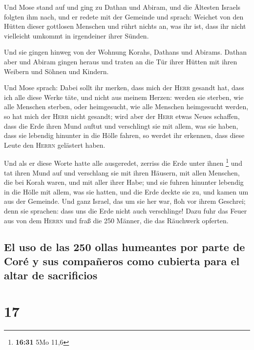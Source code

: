  Und Mose stand auf und ging zu Dathan und Abiram, und
die Ältesten Israels folgten ihm nach,  und er redete mit
der Gemeinde und sprach: Weichet von den Hütten dieser gottlosen
Menschen und rührt nichts an, was ihr ist, dass ihr nicht vielleicht
umkommt in irgendeiner ihrer Sünden.

 Und sie gingen hinweg von der Wohnung Korahs, Dathans
und Abirams. Dathan aber und Abiram gingen heraus und traten an die Tür
ihrer Hütten mit ihren Weibern und Söhnen und Kindern.

 Und Mose sprach: Dabei sollt ihr merken, dass mich der
\textsc{Herr} gesandt hat, dass ich alle diese Werke täte, und nicht aus
meinem Herzen:  werden sie sterben, wie alle Menschen
sterben, oder heimgesucht, wie alle Menschen heimgesucht werden, so hat
mich der \textsc{Herr} nicht gesandt;  wird aber der
\textsc{Herr} etwas Neues schaffen, dass die Erde ihren Mund auftut und
verschlingt sie mit allem, was sie haben, dass sie lebendig hinunter in
die Hölle fahren, so werdet ihr erkennen, dass diese Leute den
\textsc{Herrn} gelästert haben.

 Und als er diese Worte hatte alle ausgeredet, zerriss
die Erde unter ihnen \footnote{\textbf{16:31} 5Mo 11,6} 
und tat ihren Mund auf und verschlang sie mit ihren Häusern, mit allen
Menschen, die bei Korah waren, und mit aller ihrer Habe; 
und sie fuhren hinunter lebendig in die Hölle mit allem, was sie hatten,
und die Erde deckte sie zu, und kamen um aus der Gemeinde.
 Und ganz Israel, das um sie her war, floh vor ihrem
Geschrei; denn sie sprachen: dass uns die Erde nicht auch verschlinge!
 Dazu fuhr das Feuer aus von dem \textsc{Herrn} und fraß
die 250 Männer, die das Räuchwerk opferten.

\hypertarget{el-uso-de-las-250-ollas-humeantes-por-parte-de-coruxe9-y-sus-compauxf1eros-como-cubierta-para-el-altar-de-sacrificios}{%
\subsection{El uso de las 250 ollas humeantes por parte de Coré y sus
compañeros como cubierta para el altar de
sacrificios}\label{el-uso-de-las-250-ollas-humeantes-por-parte-de-coruxe9-y-sus-compauxf1eros-como-cubierta-para-el-altar-de-sacrificios}}

\hypertarget{section-16}{%
\section{17}\label{section-16}}

